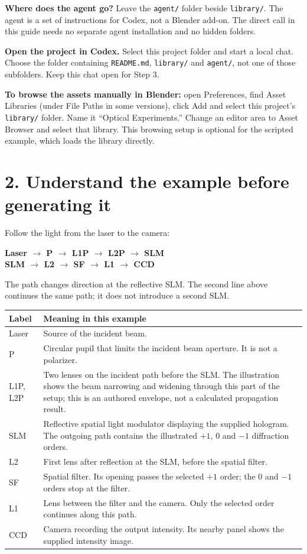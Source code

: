 \documentclass[11pt,a4paper]{article}
\begin{document}
\textbf{Where does the agent go?} Leave the \texttt{agent/} folder beside \texttt{library/}. The agent is a set of instructions for Codex, not a Blender add-on. The direct call in this guide needs no separate agent installation and no hidden folders.

\textbf{Open the project in Codex.} Select this project folder and start a local chat. Choose the folder containing \texttt{README.md}, \texttt{library/} and \texttt{agent/}, not one of those subfolders. Keep this chat open for Step 3.

\textbf{To browse the assets manually in Blender:} open Preferences, find Asset Libraries (under File Paths in some versions), click Add and select this project's \texttt{library/} folder. Name it ``Optical Experiments.'' Change an editor area to Asset Browser and select that library. This browsing setup is optional for the scripted example, which loads the library directly.
\clearpage
\section*{2. Understand the example before generating it}
Follow the light from the laser to the camera:
\begin{center}
\textbf{Laser $\rightarrow$ P $\rightarrow$ L1P $\rightarrow$ L2P $\rightarrow$ SLM}\\[5pt]
\textbf{SLM $\rightarrow$ L2 $\rightarrow$ SF $\rightarrow$ L1 $\rightarrow$ CCD}
\end{center}
The path changes direction at the reflective SLM. The second line above continues the same path; it does not introduce a second SLM.

\renewcommand{\arraystretch}{1.25}
\begin{tabularx}{\linewidth}{@{}p{20mm}X@{}}
\textbf{Label} & \textbf{Meaning in this example}\\\hline
Laser & Source of the incident beam.\\
P & Circular pupil that limits the incident beam aperture. It is not a polarizer.\\
L1P, L2P & Two lenses on the incident path before the SLM. The illustration shows the beam narrowing and widening through this part of the setup; this is an authored envelope, not a calculated propagation result.\\
SLM & Reflective spatial light modulator displaying the supplied hologram. The outgoing path contains the illustrated $+1$, $0$ and $-1$ diffraction orders.\\
L2 & First lens after reflection at the SLM, before the spatial filter.\\
SF & Spatial filter. Its opening passes the selected $+1$ order; the $0$ and $-1$ orders stop at the filter.\\
L1 & Lens between the filter and the camera. Only the selected order continues along this path.\\
CCD & Camera recording the output intensity. Its nearby panel shows the supplied intensity image.\\
\end{tabularx}
\end{document}
